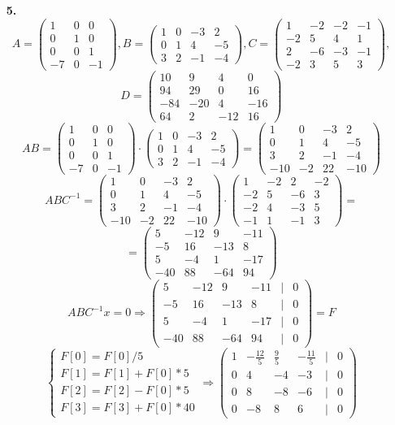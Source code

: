 \documentclass[a4paper]{article}
\newcommand{\mat}[1]{\begin{pmatrix} #1 \end{pmatrix}}
\newcommand{\case}[1]{\begin{cases} #1 \end{cases}}
\renewcommand{\r}{\Rightarrow}
\begin{document}
\begin{enumerate}
    \item[\textbf{5.}]{\small $$A = \mat{1 & 0 & 0 \\ 0 & 1 &0 \\ 0 & 0 & 1 \\ -7 & 0 & -1},
    B = \mat{1 & 0 & -3 & 2 \\ 0 & 1 & 4 & -5 \\ 3 & 2 & -1 & -4},
    C = \mat{1 & -2 & -2 & -1 \\ -2 & 5 & 4 & 1 \\ 2 & -6 & -3 & -1 \\ -2 & 3 & 5 & 3},$$
    $$D = \mat{10 & 9 & 4 & 0 \\ 94 & 29 & 0 & 16 \\ -84 & -20 & 4 & -16 \\ 64 & 2 & -12 & 16}$$}
    $$AB = \mat{1 & 0 & 0 \\ 0 & 1 &0 \\ 0 & 0 & 1 \\ -7 & 0 & -1} \cdot \mat{1 & 0 & -3 & 2 \\ 0 & 1 & 4 & -5 \\ 3 & 2 & -1 & -4} = 
    \mat{1 & 0 & -3 & 2 \\ 0 & 1 & 4 & -5 \\ 3 & 2 & -1 & -4 \\ -10 & -2 & 22 & -10}$$
    $$ABC^{-1} = \mat{1 & 0 & -3 & 2 \\ 0 & 1 & 4 & -5 \\ 3 & 2 & -1 & -4 \\ -10 & -2 & 22 & -10} \cdot \mat{1 & -2 & 2 & -2 \\ -2 & 5 & -6 & 3 \\ -2 & 4 & -3 & 5 \\ -1 & 1 & -1 & 3} = $$
    $$= \mat{5 & -12 & 9 & -11 \\ -5 & 16 & -13 & 8 \\ 5 & -4 & 1 & -17 \\ -40 & 88 & -64 & 94}$$
    $$ABC^{-1}x = 0 \r \mat{5 & -12 & 9 & -11 &| &0\\ -5 & 16 & -13 & 8&| &0 \\ 5 & -4 & 1 & -17 &| &0\\ -40 & 88 & -64 & 94 &| &0} = F$$
    $$\case{F[0] = F[0]/5\\
    F[1] = F[1]+F[0]*5\\
    F[2] = F[2]-F[0]*5\\
    F[3] = F[3] + F[0]*40} \r \mat{1 & -\frac{12}{5} & \frac{9}{5} & -\frac{11}{5} & | & 0 \\ 0 & 4 & -4 & -3 & | & 0 \\ 0 & 8 & -8 & -6 & | & 0 \\ 0 & -8 & 8 & 6 & | & 0}$$

\end{enumerate}
\end{document}
